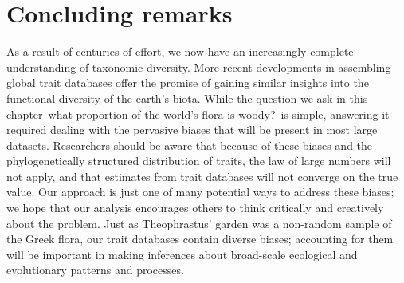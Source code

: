 \section{Concluding remarks}

As a result of centuries of effort, we now have an increasingly
complete understanding of taxonomic diversity.  More recent
developments in assembling global trait databases offer the promise of
gaining similar insights into the functional diversity of the earth's
biota.
%
While the question we ask in this chapter--what proportion of the
world's flora is woody?--is simple, answering it required dealing
with the pervasive biases that will be present in most large datasets.
%
Researchers should be aware that because of these biases and the
phylogenetically structured distribution of traits, the law of large
numbers will not apply, and that estimates from trait databases will
not converge on the true value.
%
Our approach is just one of many potential ways to address these
biases; we hope that our analysis encourages others to think
critically and creatively about the problem.
%
Just as Theophrastus' garden was a non-random sample of the Greek
flora, our trait databases contain diverse biases; accounting for them
will be important in making inferences about broad-scale ecological
and evolutionary patterns and processes.


